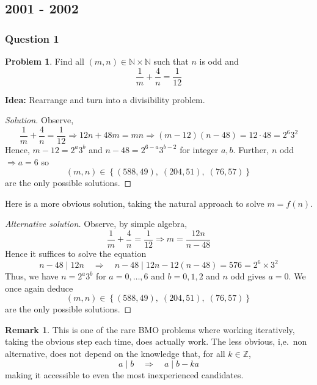 \documentclass[11pt]{article}
\theoremstyle{definition}
\newtheorem*{problem}{Problem}
\newtheorem*{remark}{Remark}
\begin{document}
\newpage

\subsection{2001 - 2002}

\subsubsection{Question 1}

\begin{problem}
  Find all $(m, n) \in \mathbb{N} \times \mathbb{N}$ such that $n$ is odd and \[\frac{1}{m} + \frac{4}{n} = \frac{1}{12}\]
\end{problem}

{\bf Idea:} Rearrange and turn into a divisibility problem. 

\begin{proof}[Solution]
  Observe, 
  \[\frac{1}{m} + \frac{4}{n} = \frac{1}{12} \Longrightarrow 12n + 48m = mn \Longrightarrow (m-12)(n-48) = 12 \cdot 48 = 2^6 3^2\]
  Hence, $m-12 = 2^{a}3^b$ and $n-48 = 2^{6-a}3^{b-2}$ for integer $a,b$. Further, $n$ odd $\Rightarrow a = 6$ so 
  \[(m, n) \in \left\{(588, 49), \; (204, 51), \; (76, 57)\right\}\]
  are the only possible solutions.
\end{proof}

Here is a more obvious solution, taking the natural approach to solve $m = f(n)$. 

\begin{proof}[Alternative solution]
  Observe, by simple algebra, 
  \[\frac{1}{m} + \frac{4}{n} = \frac{1}{12} \Longrightarrow m = \frac{12n}{n-48}\]
  Hence it suffices to solve the equation 
  \[n - 48 \; {\Bigg |} \;  12n \quad \Longrightarrow \quad n - 48 \; {\Bigg |} \;  12n - 12(n - 48) = 576 = 2^6 \times 3^2\]
  Thus, we have $n = 2^a 3^b$ for $a = 0, \dots, 6$ and $b = 0, 1, 2$ and $n$ odd gives $a = 0$. We once again deduce 
  \[(m, n) \in \left\{(588, 49), \; (204, 51), \; (76, 57)\right\}\]
  are the only possible solutions.
\end{proof}

\begin{remark}
  This is one of the rare BMO problems where working iteratively, taking the obvious step each time, does actually 
  work. The less obvious, i,e.~non alternative, does not depend on the knowledge that, for all $k \in \mathbb{Z}$,
  \[a \; {\Big |} \; b \quad  \Longrightarrow \quad a \; {\Big |} \; b - ka\]
  making it accessible to even the most inexperienced candidates. 
\end{remark}
\end{document}
